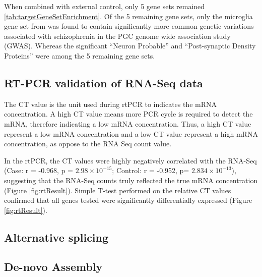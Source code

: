 When combined with external control, only 5 gene sets remained \ref{tab:targetGeneSetEnrichment}. 
Of the 5 remaining gene sets, only the microglia gene set from \citet{Miller2010} was found to contain significantly more common genetic variations associated with schizophrenia in the PGC genome wide association study (GWAS).
Whereas the significant ``Neuron Probable'' and ``Post-synaptic Density Proteins'' were among the 5 remaining gene sets.

\subsection{RT-PCR validation of RNA-Seq data}
The CT value is the unit used during rtPCR to indicates the mRNA concentration.
A high CT value means more PCR cycle is required to detect the mRNA, therefore indicating a low mRNA concentration.
Thus, a high CT value represent a low mRNA concentration and a low CT value represent a high mRNA concentration, as oppose to the RNA Seq count value.

In the rtPCR, the CT values were highly negatively correlated with the RNA-Seq (Case: r  = -0.968, p = $2.98\times10^{-15}$; Control: r  = -0.952, p= $2.834\times10^{-13}$), suggesting that the RNA-Seq counts truly reflected the true mRNA concentration (Figure \ref{fig:rtResult}). 
Simple T-test performed on the relative CT values confirmed that all genes tested were significantly differentially expressed (Figure \ref{fig:rtResult}).


	
\subsection{Alternative splicing}
\subsection{De-novo Assembly}
